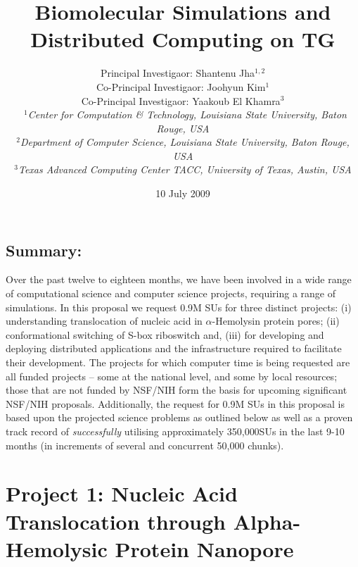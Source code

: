 \documentclass[a4paper,10pt]{article}
\begin{document}
\title{\large Biomolecular Simulations and Distributed Computing on TG}

\author{Principal Investigaor: Shantenu Jha$^{1,2}$ \\ Co-Principal Investigaor: Joohyun Kim$^{1}$ \\ Co-Principal Investigaor: Yaakoub El Khamra$^{3}$\\\
   \small{\emph{$^{1}$Center for Computation \& Technology, Louisiana State University, Baton Rouge, 
USA}}
\\
  \small{\emph{$^{2}$Department of Computer Science, Louisiana State
      University, Baton Rouge, USA}}
\\
  \small{\emph{$^{3}$Texas Advanced Computing Center TACC, University of Texas, Austin, USA}}}



\date{10 July 2009}

\maketitle

\subsection*{Summary:} Over the past twelve to eighteen months, we have been involved in a wide 
range of computational science and computer science projects, requiring a range of simulations.
In this proposal we request 0.9M SUs for three distinct projects:
(i) understanding translocation of nucleic acid in $\alpha$-Hemolysin protein pores; (ii)
conformational switching of S-box riboswitch and, (iii) for developing and 
deploying distributed applications and the infrastructure required to facilitate
their development. 
The projects for which computer time is being requested are all funded projects -- some at the national level, and some
by local resources; those that are not funded by NSF/NIH form the basis for upcoming significant
NSF/NIH proposals. 
Additionally, the request for 0.9M SUs in this proposal 
is based upon the projected science problems as outlined below as well as a proven
track record of
{\it successfully} utilising approximately 350,000SUs in the last 9-10 months (in increments
of several and concurrent 50,000 chunks).


\section{Project 1: Nucleic Acid Translocation through Alpha-Hemolysic Protein Nanopore}
\end{document}
